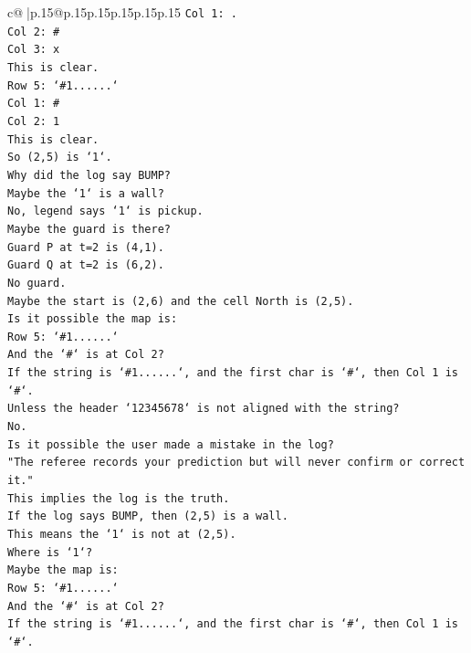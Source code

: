 \documentclass{article}
\begin{document}
{\begin{supertabular}{c@{$\;$}|p{.15\linewidth}@{}p{.15\linewidth}p{.15\linewidth}p{.15\linewidth}p{.15\linewidth}p{.15\linewidth}}
{{{\texttt{Col 1: .} \\
\texttt{Col 2: \#} \\
\texttt{Col 3: x} \\
\texttt{This is clear.} \\
\texttt{Row 5: `\#1......`} \\
\texttt{Col 1: \#} \\
\texttt{Col 2: 1} \\
\texttt{This is clear.} \\
\texttt{So (2,5) is `1`.} \\
\texttt{Why did the log say BUMP?} \\
\texttt{Maybe the `1` is a wall?} \\
\texttt{No, legend says `1` is pickup.} \\
\texttt{Maybe the guard is there?} \\
\texttt{Guard P at t=2 is (4,1).} \\
\texttt{Guard Q at t=2 is (6,2).} \\
\texttt{No guard.} \\
\texttt{Maybe the start is (2,6) and the cell North is (2,5).} \\
\texttt{Is it possible the map is:} \\
\texttt{Row 5: `\#1......`} \\
\texttt{And the `\#` is at Col 2?} \\
\texttt{If the string is `\#1......`, and the first char is `\#`, then Col 1 is `\#`.} \\
\texttt{Unless the header `12345678` is not aligned with the string?} \\
\texttt{No.} \\
\texttt{Is it possible the user made a mistake in the log?} \\
\texttt{"The referee records your prediction but will never confirm or correct it."} \\
\texttt{This implies the log is the truth.} \\
\texttt{If the log says BUMP, then (2,5) is a wall.} \\
\texttt{This means the `1` is not at (2,5).} \\
\texttt{Where is `1`?} \\
\texttt{Maybe the map is:} \\
\texttt{Row 5: `\#1......`} \\
\texttt{And the `\#` is at Col 2?} \\
\texttt{If the string is `\#1......`, and the first char is `\#`, then Col 1 is `\#`.} \\
}}}
\end{supertabular}}
\end{document}
